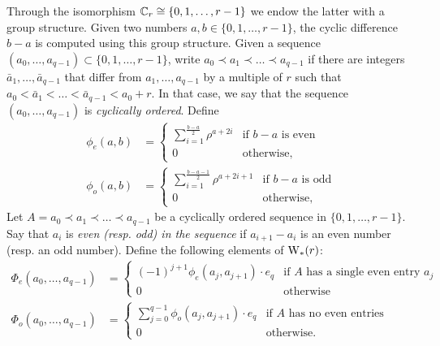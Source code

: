 Through the isomorphism $\mathbb{C}_r \cong \{0,1,\dots,r-1\}$ we endow the latter with a group structure. Given two numbers $a,b\in \{0,1,\dots,r-1\}$, the cyclic difference $b-a$ is computed using this group structure. Given a sequence $(a_0,\dots,a_{q-1}) \subset \{0,1,\dots,r-1\}$, write $a_0\prec a_1\prec \dots\prec a_{q-1}$ if there are integers $\bar{a}_1,\dots,\bar{a}_{q-1}$ that differ from $a_1,\dots,a_{q-1}$ by a multiple of $r$ such that $a_0<\bar{a}_1<\dots<\bar{a}_{q-1}<a_0+r$. In that case, we say that the sequence $(a_0,\dots,a_{q-1})$ is \emph{cyclically ordered}. Define
\begin{align*}
	\phi_{e}(a,b) &= \begin{cases}
		\displaystyle \sum_{i=1}^{\frac{b-a}{2}} \rho^{a+2i} & \text{if $b-a$ is even} \\
		0 & \text{otherwise,}
	\end{cases}
	\\
	\phi_{o}(a,b) &= \begin{cases}
		\displaystyle \sum_{i=1}^{\frac{b-a-1}{2}} \rho^{a+2i+1} & \text{if $b-a$ is odd} \\
		0 & \text{otherwise,}
	\end{cases}
\end{align*}
Let $A= a_0\prec a_1\prec\dots\prec a_{q-1}$ be a cyclically ordered sequence in $\{0,1,\dots,r-1\}$. Say that $a_i$ is \emph{even (resp. \emph{odd}) in the sequence} if $a_{i+1}-a_i$ is an even number (resp. an odd number).
Define the following elements of $\operatorname{W}_{*}(r)$:
\begin{align*}
	\Phi_e(a_0,\dots,a_{q-1}) &= \begin{cases}
		(-1)^{j+1}\phi_e(a_j,a_{j+1})\cdot e_q & \text{if $A$ has a single even entry $a_j$} \\
		0 & \text{otherwise}
	\end{cases}
	\\
	\Phi_o(a_0,\dots,a_{q-1}) &= \begin{cases}
		\sum_{j=0}^{q-1} \phi_o(a_j,a_{j+1})\cdot e_q & \text{if $A$ has no even entries} \\
		0 & \text{otherwise.}
	\end{cases}
\end{align*}

